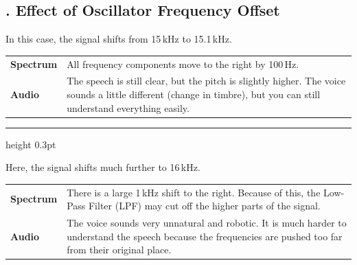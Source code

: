 \documentclass[a4paper]{article}
\begin{document}


\subsection*{\textcolor{DodgerBlue4}{\Large {}. Effect of Oscillator Frequency Offset}}

\vspace{6pt}


\vspace{4pt}
\noindent In this case, the signal shifts from 15\,kHz to 15.1\,kHz.

\vspace{6pt}
\noindent\begin{tabular}{@{} p{2.8cm} p{10.5cm} @{}}
    \textbf{Spectrum} & All frequency components move to the right by 100\,Hz. \\[8pt]
    \textbf{Audio}    & The speech is still clear, but the pitch is slightly higher. 
                        The voice sounds a little different (change in timbre), but 
                        you can still understand everything easily. \\
\end{tabular}

\vspace{14pt}
\hrule height 0.3pt
\vspace{14pt}


\vspace{4pt}
\noindent Here, the signal shifts much further to 16\,kHz.

\vspace{6pt}
\noindent\begin{tabular}{@{} p{2.8cm} p{10.5cm} @{}}
    \textbf{Spectrum} & There is a large 1\,kHz shift to the right. Because of 
                        this, the Low-Pass Filter (LPF) may cut off the higher 
                        parts of the signal. \\[8pt]
    \textbf{Audio}    & The voice sounds very unnatural and robotic. It is much 
                        harder to understand the speech because the frequencies 
                        are pushed too far from their original place. \\
\end{tabular}
\end{document}
